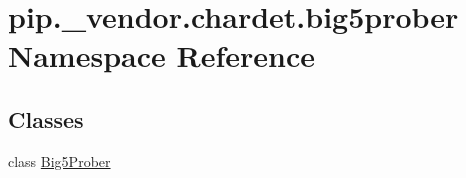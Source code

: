 \hypertarget{namespacepip_1_1__vendor_1_1chardet_1_1big5prober}{}\section{pip.\+\_\+vendor.\+chardet.\+big5prober Namespace Reference}
\label{namespacepip_1_1__vendor_1_1chardet_1_1big5prober}
\subsection*{Classes}
\begin{DoxyCompactItemize}
\item 
class \hyperlink{classpip_1_1__vendor_1_1chardet_1_1big5prober_1_1Big5Prober}{Big5\+Prober}
\end{DoxyCompactItemize}
